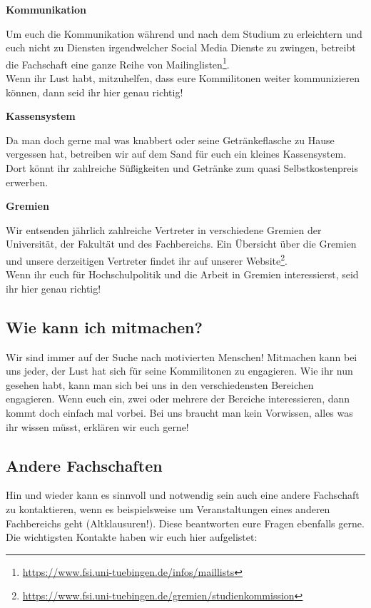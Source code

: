\textbf{Kommunikation}

Um euch die Kommunikation während und nach dem Studium zu erleichtern und euch nicht zu Diensten irgendwelcher Social Media Dienste zu zwingen, betreibt die Fachschaft eine ganze Reihe von Mailinglisten\footnote{\url{https://www.fsi.uni-tuebingen.de/infos/maillists}}. \\
Wenn ihr Lust habt, mitzuhelfen, dass eure Kommilitonen weiter kommunizieren können, dann seid ihr hier genau richtig!

\textbf{Kassensystem}

Da man doch gerne mal was knabbert oder seine Getränkeflasche zu Hause vergessen hat, betreiben wir auf dem Sand für euch ein kleines Kassensystem. Dort könnt ihr zahlreiche Süßigkeiten und Getränke zum quasi Selbstkostenpreis erwerben. 

\textbf{Gremien}

Wir entsenden jährlich zahlreiche Vertreter in verschiedene Gremien der Universität, der Fakultät und des Fachbereichs. Ein Übersicht über die Gremien und unsere derzeitigen Vertreter findet ihr auf unserer Website\footnote{\url{https://www.fsi.uni-tuebingen.de/gremien/studienkommission}}. \\
Wenn ihr euch für Hochschulpolitik und die Arbeit in Gremien interessierst, seid ihr hier genau richtig!

%
\subsection{Wie kann ich mitmachen?}
Wir sind immer auf der Suche nach motivierten Menschen! Mitmachen kann bei uns jeder, der Lust hat sich für seine Kommilitonen zu engagieren. Wie ihr nun gesehen habt, kann man sich bei uns in den verschiedensten Bereichen engagieren. Wenn euch ein, zwei oder mehrere der Bereiche interessieren, dann kommt doch einfach mal vorbei. Bei uns braucht man kein Vorwissen, alles was ihr wissen müsst, erklären wir euch gerne!

\vfill
\subsection{Andere Fachschaften}
Hin und wieder kann es sinnvoll und notwendig sein auch eine andere Fachschaft zu kontaktieren, wenn es beispielsweise um Veranstaltungen eines anderen Fachbereichs geht (Altklausuren!). Diese beantworten eure Fragen ebenfalls gerne. Die wichtigsten Kontakte haben wir euch hier aufgelistet:

